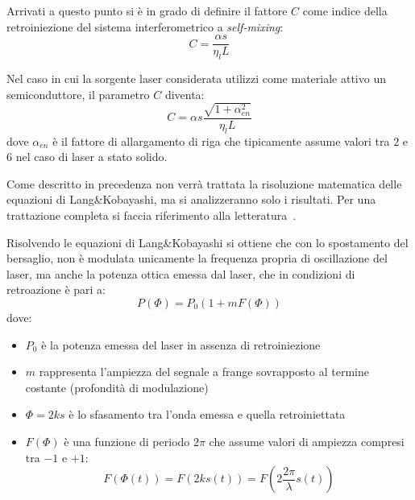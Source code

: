 Arrivati a questo punto si è in grado di definire il fattore $C$ come indice della retroiniezione del sistema interferometrico a \textit{self-mixing}:
\begin{equation}
	C = \frac{\alpha s}{\eta_l L}
\end{equation}

Nel caso in cui la sorgente laser considerata utilizzi come materiale attivo un semiconduttore, il parametro $C$ diventa:
\begin{equation}
	C=\alpha s \frac{\sqrt{1+\alpha_{en}^2}}{\eta_l L}
\end{equation}
dove $\alpha_{en}$ è il fattore di allargamento di riga che tipicamente assume valori tra $2$ e $6$ nel caso di laser a stato solido.

Come descritto in precedenza non verrà trattata la risoluzione matematica delle equazioni di Lang\&Kobayashi, ma si analizzeranno solo i risultati. Per una trattazione completa si faccia riferimento alla letteratura~\cite{1070479}.

Risolvendo le equazioni di Lang\&Kobayashi si ottiene che con lo spostamento del bersaglio, non è modulata unicamente la frequenza propria di oscillazione del laser, ma anche la potenza ottica emessa dal laser, che in condizioni di retroazione è pari a:
\begin{equation}
	P(\Phi)=P_0(1+mF(\Phi))
\end{equation}
dove:
\begin{itemize}
	\item $P_0$ è la potenza emessa del laser in assenza di retroiniezione 
	\item $m$ rappresenta l'ampiezza del segnale a frange sovrapposto al termine costante (profondità di modulazione)
	\item $\Phi = 2ks$ è lo sfasamento tra l'onda emessa e quella retroiniettata 
	\item $F(\Phi)$ è una funzione di periodo $2\pi$ che assume valori di ampiezza compresi tra $-1$ e $+1$:
		\begin{equation}
			F(\Phi(t))=F(2ks(t))=F(2\frac{2\pi}{\lambda}s(t))
		\end{equation}
\end{itemize}


